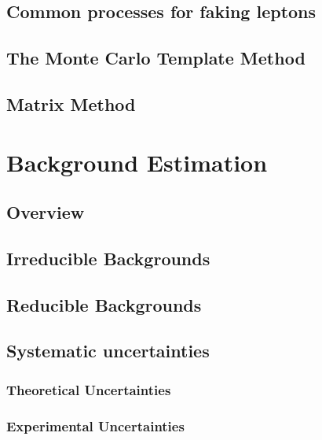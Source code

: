 \documentclass{outhesis}
\begin{document}
\section{Common processes for faking leptons}\label{sec:fake.proc}

\section{The Monte Carlo Template Method}\label{sec:fake.mct}

\section{Matrix Method}\label{sec:fake.mxm}


\chapter{Background Estimation}\label{chap:bkg}
\graphicspath{{figures/bkg/}}
\section{Overview}\label{sec:bkg.overview}

\section{Irreducible Backgrounds}\label{sec:bkg.irred}

\section{Reducible Backgrounds}\label{sec:bkg.red}

\section{Systematic uncertainties}\label{chap:syst}

\subsection{Theoretical Uncertainties}\label{sec:syst.theory}

\subsection{Experimental Uncertainties}\label{sec:syst.exp}

\end{document}

